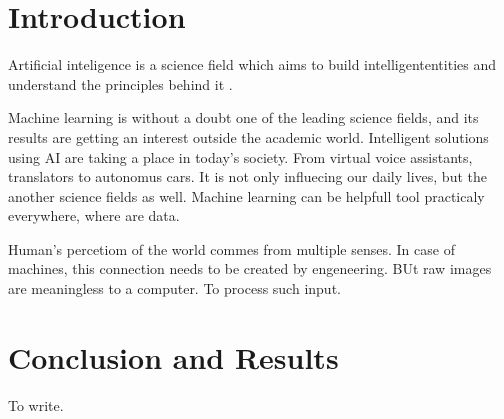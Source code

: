 \documentclass[twoside]{ctuthesis}
\theoremstyle{plain}
\theoremstyle{definition}
\theoremstyle{note}
\begin{document}
\maketitle


\chapter{Introduction}
Artificial inteligence is a science field which aims to build intelligententities
and understand the principles behind it \cite{AIMA_book}.




Machine learning is without a doubt one of the leading science fields, and its 
results are getting an interest outside the academic world. Intelligent solutions
using AI are taking a place in today's society. From virtual voice assistants, 
translators to autonomus cars. It is not only influecing our daily lives,
but the another science fields as well. Machine learning can be helpfull
tool practicaly everywhere, where are data. 

Human's percetiom of the world commes from multiple senses. In case of machines,
this connection needs to be created by engeneering. BUt raw images are meaningless
to a computer. To process such input.









\chapter{Conclusion and Results}
To write.


\appendix
\end{document}
